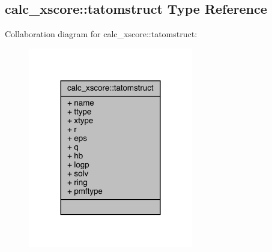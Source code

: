 \hypertarget{structcalc__xscore_1_1tatomstruct}{\subsection{calc\-\_\-xscore\-:\-:tatomstruct Type Reference}
\label{structcalc__xscore_1_1tatomstruct}
}


Collaboration diagram for calc\-\_\-xscore\-:\-:tatomstruct\-:
\nopagebreak
\begin{figure}[H]
\begin{center}
\leavevmode
\includegraphics[width=204pt]{structcalc__xscore_1_1tatomstruct__coll__graph}
\end{center}
\end{figure}
